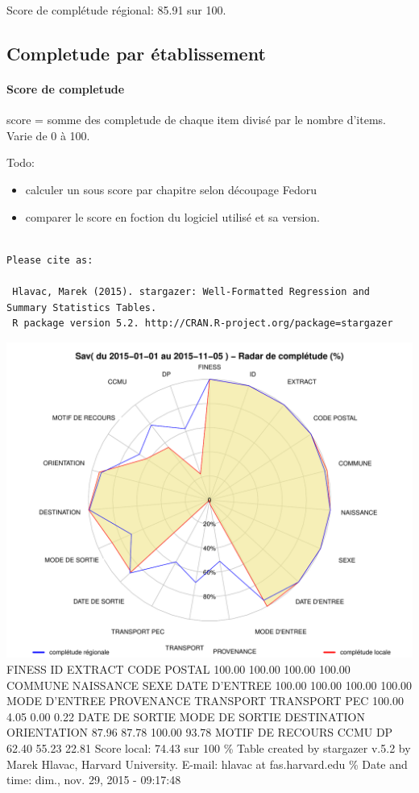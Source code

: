 \documentclass[]{article}
\begin{document}
Score de complétude régional: 85.91 sur 100.

\subsection{Completude par
établissement}\label{completude-par-etablissement}

\paragraph{Score de completude}\label{score-de-completude}

score = somme des completude de chaque item divisé par le nombre
d'items. Varie de 0 à 100.

Todo:

\begin{itemize}
\itemsep1pt\parskip0pt
\item
  calculer un sous score par chapitre selon découpage Fedoru
\item
  comparer le score en foction du logiciel utilisé et sa version.
\end{itemize}

\begin{verbatim}

Please cite as: 

 Hlavac, Marek (2015). stargazer: Well-Formatted Regression and Summary Statistics Tables.
 R package version 5.2. http://CRAN.R-project.org/package=stargazer 
\end{verbatim}

\includegraphics{completude_files/figure-latex/finess-1.pdf} FINESS ID
EXTRACT CODE POSTAL 100.00 100.00 100.00 100.00 COMMUNE NAISSANCE SEXE
DATE D'ENTREE 100.00 100.00 100.00 100.00 MODE D'ENTREE PROVENANCE
TRANSPORT TRANSPORT PEC 100.00 4.05 0.00 0.22 DATE DE SORTIE MODE DE
SORTIE DESTINATION ORIENTATION 87.96 87.78 100.00 93.78 MOTIF DE RECOURS
CCMU DP 62.40 55.23 22.81 Score local: 74.43 sur 100 \% Table created by
stargazer v.5.2 by Marek Hlavac, Harvard University. E-mail: hlavac at
fas.harvard.edu \% Date and time: dim., nov. 29, 2015 - 09:17:48
\end{document}
